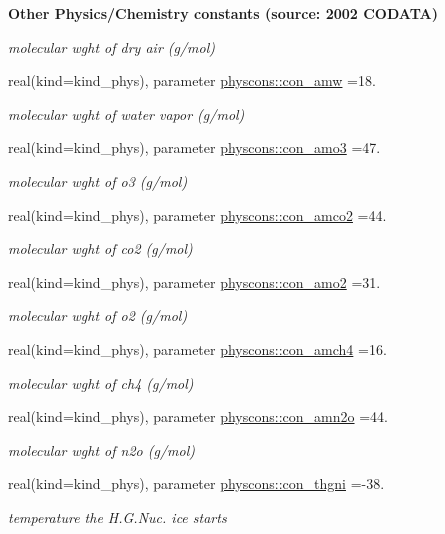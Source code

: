 \begin{Indent}{\bf Other Physics/\+Chemistry constants (source\+: 2002 C\+O\+D\+A\+TA)}
\begin{DoxyCompactItemize}
\begin{DoxyCompactList}\small\item\em molecular wght of dry air (g/mol) \end{DoxyCompactList}\item 
real(kind=kind\+\_\+phys), parameter \hyperlink{namespacephyscons_afcf5656ae531bc0a656bd079bfe157c3}{physcons\+::con\+\_\+amw} =18.
\begin{DoxyCompactList}\small\item\em molecular wght of water vapor (g/mol) \end{DoxyCompactList}\item 
real(kind=kind\+\_\+phys), parameter \hyperlink{namespacephyscons_aa2a3f6c3591ab317abdc629b20c3f87f}{physcons\+::con\+\_\+amo3} =47.
\begin{DoxyCompactList}\small\item\em molecular wght of o3 (g/mol) \end{DoxyCompactList}\item 
real(kind=kind\+\_\+phys), parameter \hyperlink{namespacephyscons_a1e3ed46b6ce3d1a82db6a192c840091f}{physcons\+::con\+\_\+amco2} =44.
\begin{DoxyCompactList}\small\item\em molecular wght of co2 (g/mol) \end{DoxyCompactList}\item 
real(kind=kind\+\_\+phys), parameter \hyperlink{namespacephyscons_adffb549f49f2a2160ad3187ef75f60d5}{physcons\+::con\+\_\+amo2} =31.
\begin{DoxyCompactList}\small\item\em molecular wght of o2 (g/mol) \end{DoxyCompactList}\item 
real(kind=kind\+\_\+phys), parameter \hyperlink{namespacephyscons_af16eb677db27151bc06db14eefd6c07d}{physcons\+::con\+\_\+amch4} =16.
\begin{DoxyCompactList}\small\item\em molecular wght of ch4 (g/mol) \end{DoxyCompactList}\item 
real(kind=kind\+\_\+phys), parameter \hyperlink{namespacephyscons_abb34f0d5a19aef4a975fb5b1e3141a7b}{physcons\+::con\+\_\+amn2o} =44.
\begin{DoxyCompactList}\small\item\em molecular wght of n2o (g/mol) \end{DoxyCompactList}\item 
real(kind=kind\+\_\+phys), parameter \hyperlink{namespacephyscons_a4d194dd8f216004f2f7b9e4521c2fe2c}{physcons\+::con\+\_\+thgni} =-\/38.
\begin{DoxyCompactList}\small\item\em temperature the H.\+G.\+Nuc. ice starts \end{DoxyCompactList}\end{DoxyCompactItemize}
\end{Indent}
